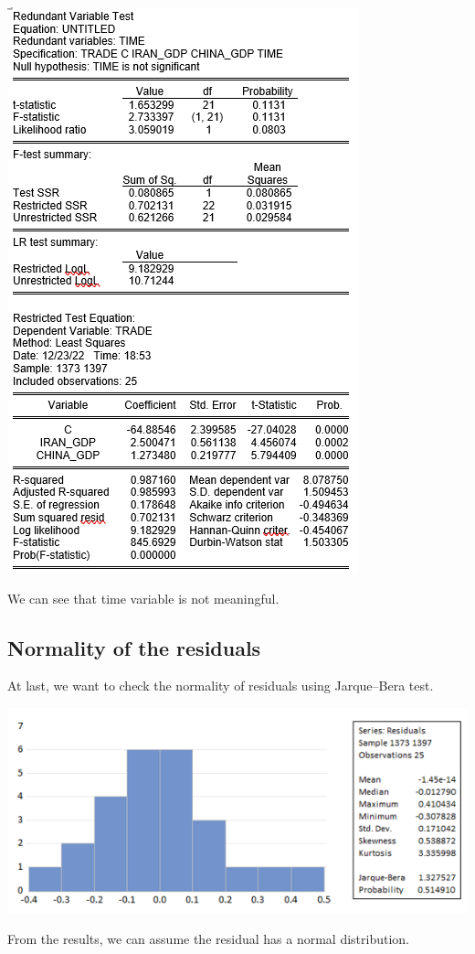 \documentclass[12pt, letterpaper, twoside]{article}
\begin{document}
        \includegraphics[width=.8\textwidth,height=.8\textwidth,keepaspectratio,center]{24.png}
        
We can see that time variable is not meaningful.

\subsection{Normality of the residuals}

At last, we want to check the normality of residuals using Jarque–Bera test.

        \includegraphics[width=.6\textwidth,height=.6\textwidth,keepaspectratio,center]{25.png}
        
From the results, we can assume the residual has a normal distribution.
\end{document}
